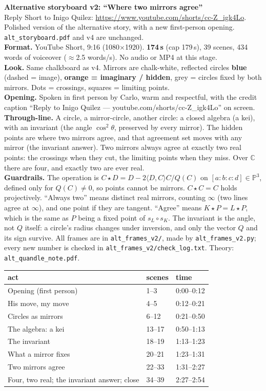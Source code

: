 \documentclass[10pt]{article}
\begin{document}
{\LARGE\bfseries Alternative storyboard v2: ``Where two mirrors agree''}\\[3pt]
Reply Short to Inigo Quilez: \url{https://www.youtube.com/shorts/cc-Z_igk4Lo}. Polished version of the alternative story, with a new first-person opening. \texttt{alt\_storyboard.pdf} and v4 are unchanged.\\[6pt]
\textbf{Format.} YouTube Short, 9:16 (1080$\times$1920). \textbf{174\,s} (cap 179\,s), 39 scenes, 434 words of voiceover ($\approx$2.5 words/s). No audio or MP4 at this stage.\\
\textbf{Look.} Same chalkboard as v4. Mirrors are chalk-white, reflected circles \textcolor[HTML]{4DA3FF}{\textbf{blue}} (dashed = image), \textcolor[HTML]{FF9A3C}{\textbf{orange = imaginary / hidden}}, grey = circles fixed by both mirrors. Dots = crossings, squares = limiting points.\\
\textbf{Opening.} Spoken in first person by Carlo, warm and respectful, with the credit caption ``Reply to Inigo Quilez --- youtube.com/shorts/cc-Z\_igk4Lo'' on screen.\\ \textbf{Through-line.} A circle, a mirror-circle, another circle: a closed algebra (a kei), with an invariant (the angle $\cos^2\theta$, preserved by every mirror). The hidden points are where two mirrors agree, and that agreement set moves with any mirror (the invariant answer). Two mirrors always agree at exactly two real points: the crossings when they cut, the limiting points when they miss. Over $\mathbb C$ there are four, and exactly two are ever real.\\[4pt]
\textbf{Guardrails.} The operation is $C\star D=D-2\langle D,C\rangle C/Q(C)$ on $[a:b:c:d]\in\mathbb P^3$, defined only for $Q(C)\neq0$, so points cannot be mirrors. $C\star C=C$ holds projectively. ``Always two'' means distinct real mirrors, counting $\infty$ (two lines agree at $\infty$), and one point if they are tangent. ``Agree'' means $K\star P=L\star P$, which is the same as $P$ being a fixed point of $s_L\circ s_K$. The invariant is the angle, not $Q$ itself: a circle's radius changes under inversion, and only the vector $Q$ and its sign survive. All frames are in \texttt{alt\_frames\_v2/}, made by \texttt{alt\_frames\_v2.py}; every new number is checked in \texttt{alt\_frames\_v2/check\_log.txt}. Theory: \texttt{alt\_quandle\_note.pdf}.\\[4pt]
{\small\begin{tabular}{lll}\toprule act & scenes & time\\\midrule Opening (first person) & 1--3 & 0:00--0:12 \\ His move, my move & 4--5 & 0:12--0:21 \\ Circles as mirrors & 6--12 & 0:21--0:50 \\ The algebra: a kei & 13--17 & 0:50--1:13 \\ The invariant & 18--19 & 1:13--1:23 \\ What a mirror fixes & 20--21 & 1:23--1:31 \\ Two mirrors agree & 22--33 & 1:31--2:27 \\ Four, two real; the invariant answer; close & 34--39 & 2:27--2:54 \\\bottomrule\end{tabular}}\\[4pt]
\end{document}
